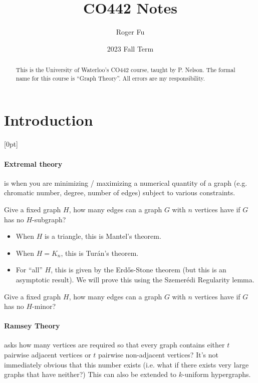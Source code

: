 \documentclass{scrartcl}
\author{Roger Fu}
\date{2023 Fall Term}
\title{CO442 Notes}
\newcommand*{\rmnote}[2][0pt]{\reversemarginpar{}\marginnote{\footnotesize #2}[#1]\normalmarginpar{}}
\newcommand*{\lecture}[1]{\rmnote{\ttfamily #1}}
\begin{document}
\maketitle
\begin{abstract}
  This is the University of Waterloo's CO442 course, taught by P. Nelson.
  The formal name for this course is ``Graph Theory''.
  All errors are my responsibility.
\end{abstract}

\tableofcontents
\clearpage
\section{Introduction}\lecture{Thu Sep 07}
\paragraph{Extremal theory} is when you are minimizing / maximizing a numerical
quantity of a graph (e.g. chromatic number, degree, number of edges)
subject to various constraints.

\begin{question*}
  Give a fixed graph $H$, how many edges can a graph $G$ with $n$ vertices have
  if $G$ has no $H$-subgraph?
\end{question*}
\begin{itemize}
  \item When $H$ is a triangle, this is Mantel's theorem.
  \item When $H = K_n$, this is Tur\'an's theorem.
  \item For ``all'' $H$, this is given by the Erd\H{o}s-Stone theorem
    (but this is an asymptotic result).
    We will prove this using the Szemer\'edi Regularity lemma.
\end{itemize}

\begin{question*}
  Give a fixed graph $H$, how many edges can a graph $G$ with $n$ vertices have
  if $G$ has no $H$-minor?
\end{question*}

\paragraph{Ramsey Theory} asks how many vertices are required so that every graph
contains either $t$ pairwise adjacent vertices or $t$ pairwise non-adjacent
vertices?
It's not immediately obvious that this number exists (i.e. what if there exists
very large graphs that have neither?)
This can also be extended to $k$-uniform hypergraphs.
\end{document}
